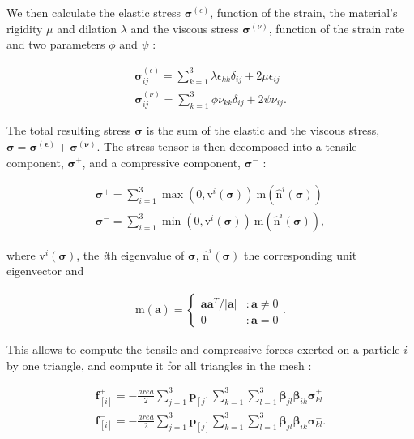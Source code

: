 \documentclass[tog]{acmsiggraph}
\begin{document}
We then calculate the elastic stress $\pmb{\sigma}^{(\epsilon)}$, function of the strain, the material's rigidity $\mu$ and dilation $\lambda$ and the viscous stress $\pmb{\sigma}^{(\nu)}$, function of the strain rate and two parameters $\phi$ and $\psi$ :

\begin{gather}
\pmb{\sigma}_{ij}^{(\epsilon)} = \sum_{k =1}^3 \lambda \epsilon_{kk} \delta_{ij} + 2\mu \epsilon_{ij}\\
\pmb{\sigma}_{ij}^{(\nu)} = \sum_{k =1}^3 \phi \nu_{kk} \delta_{ij} + 2\psi \nu_{ij}.
\end{gather} 

The total resulting stress $\pmb{\sigma}$ is the sum of the elastic and the viscous stress, $\pmb{\sigma} = \pmb{\sigma^{(\epsilon)}} + \pmb{\sigma^{(\nu)}}$. The stress tensor is then decomposed into a tensile component, $\pmb{\sigma}^+$, and a compressive component, $\pmb{\sigma}^-$ : 

\begin{gather}
\pmb{\sigma}^+ = \sum_{i=1}^3 \max (0, \mathrm{v}^i(\pmb{\sigma})) \ \pmb{\mathrm{m}}(\pmb{\hat{\mathrm{n}}}^i(\pmb{\sigma}))\\
\pmb{\sigma}^- = \sum_{i=1}^3 \min (0, \mathrm{v}^i(\pmb{\sigma})) \ \pmb{\mathrm{m}}(\pmb{\hat{\mathrm{n}}}^i(\pmb{\sigma})),
\end{gather}

where $\mathrm{v}^i(\pmb{\sigma})$, the \textit{i}th eigenvalue of $\pmb{\sigma}$, $\pmb{\hat{\mathrm{n}}}^i(\pmb{\sigma})$ the corresponding unit eigenvector and 

\begin{gather}
\pmb{\mathrm{m}(a)} =
\begin{cases}
\pmb{aa}^T/|\pmb{a}| & : \pmb{a} \neq 0\\
0 & : \pmb{a} = 0
\end{cases}.
\end{gather}


This allows to compute the tensile and compressive forces exerted on a particle $i$ by one triangle, and compute it for all triangles in the mesh : 

\begin{gather}
\label{eqfp} \pmb{f}_{[i]}^{+} = -\frac{area}{2}\sum_{j = 1}^3 \pmb{p}_{[j]}\sum_{k=1}^3 \sum_{l=1}^3 \pmb{\beta}_{jl} \pmb{\beta}_{ik} \pmb{\sigma}_{kl}^{+}\\
\label{eqfm} \pmb{f}_{[i]}^{-} = -\frac{area}{2}\sum_{j = 1}^3 \pmb{p}_{[j]}\sum_{k=1}^3 \sum_{l=1}^3 \pmb{\beta}_{jl} \pmb{\beta}_{ik} \pmb{\sigma}_{kl}^{-}.
\end{gather}
\end{document}

